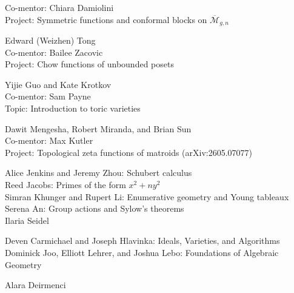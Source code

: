 
  {Co-mentor: Chiara Damiolini\\
   Project: Symmetric functions and conformal blocks on $\overline{\mathcal{M}}_{g,n}$}

  {Edward (Weizhen) Tong\\
   Co-mentor: Bailee Zacovic\\
   Project: Chow functions of unbounded posets}

  {Yijie Guo and Kate Krotkov\\
   Co-mentor: Sam Payne\\
   Topic: Introduction to toric varieties}

  {Dawit Mengesha, Robert Miranda, and Brian Sun\\
   Co-mentor: Max Kutler\\
   Project: Topological zeta functions of matroids (arXiv:2605.07077)}

  {Alice Jenkins and Jeremy Zhou: Schubert calculus\\
   Reed Jacobs: Primes of the form $x^2 + ny^2$\\
   Simran Khunger and Rupert Li: Enumerative geometry and Young tableaux\\
   Serena An: Group actions and Sylow's theorems\\
   Ilaria Seidel}

  {Deven Carmichael and Joseph Hlavinka: Ideals, Varieties, and Algorithms\\
   Dominick Joo, Elliott Lehrer, and Joshua Lebo: Foundations of Algebraic Geometry}

  {Alara Deirmenci}
